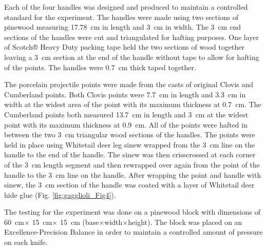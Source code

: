Each of the four handles was designed and produced to maintain a controlled standard for the experiment. 
The handles were made using two sections of pinewood measuring \SI{17.78}{\centi\metre} in length and \SI{3}{\centi\metre} in width. The \SI{3}{\centi\metre} end sections of the handles were cut and triangulated for hafting purposes. One layer of Scotch® Heavy Duty packing tape held the two sections of wood together leaving a \SI{3}{\centi\metre} section at the end of the handle without tape to allow for hafting of the points. The handles were \SI{0.7}{\centi\meter} thick taped together.  

The porcelain projectile points were made from the casts of original Clovis and Cumberland points. Both Clovis points were \SI{7.7}{\centi\metre} in length and \SI{3.3}{\centi\metre} in width at the widest area of the point with its maximum thickness at \SI{0.7}{\centi\metre}. The Cumberland points both measured \SI{13.7}{\centi\metre} in length and \SI{3}{\centi\metre} at the widest point with its maximum thickness at \SI{0.9}{\centi\metre}. All of the points were hafted in between the two \SI{3}{\centi\metre} triangular wood sections of the handles. The points were held in place using Whitetail deer leg sinew wrapped from the \SI{3}{\centi\metre} line on the handle to the end of the handle. The sinew was then crisscrossed at each corner of the \SI{3}{\centi\metre} length segment and then rewrapped over again from the point of the handle to the \SI{3}{\centi\metre} line on the handle. After wrapping the point and handle with sinew, the \SI{3}{\centi\metre} section of the handle was coated with a layer of Whitetail deer hide glue (Fig. \ref{fig:gagglioli_Fig4}). 


The testing for the experiment was done on a pinewood block with dimensions of \SI{60}{\centi\metre}$\times$ \SI{15}{\centi\metre}$\times$ \SI{15}{\centi\metre} (base$\times$width$\times$height). The block was placed on an Excellence-Precision Balance in order to maintain a controlled amount of pressure on each knife.

